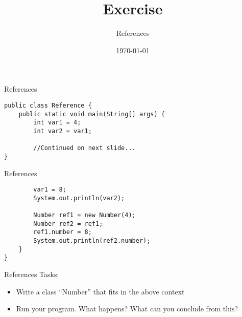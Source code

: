 


\title{Exercise}
\subtitle{References}
\date{\today}




\begin{frame}
    \titlepage
\end{frame}

\begin{frame}{References}
   \begin{lstlisting}
public class Reference {
    public static void main(String[] args) {
        int var1 = 4;
        int var2 = var1;
        
        //Continued on next slide...
}\end{lstlisting}
\end{frame}

\begin{frame}{References}
   \begin{lstlisting}
        var1 = 8;
        System.out.println(var2);
        
        Number ref1 = new Number(4);    
        Number ref2 = ref1;
        ref1.number = 8;
        System.out.println(ref2.number);
    }
}\end{lstlisting}
\end{frame}

\begin{frame}{References}
    Tasks:
    \begin{itemize}
        \item Write a class ``Number'' that fits in the above context
        \item Run your program. What happens? What can you conclude from this?
    \end{itemize}
\end{frame}



